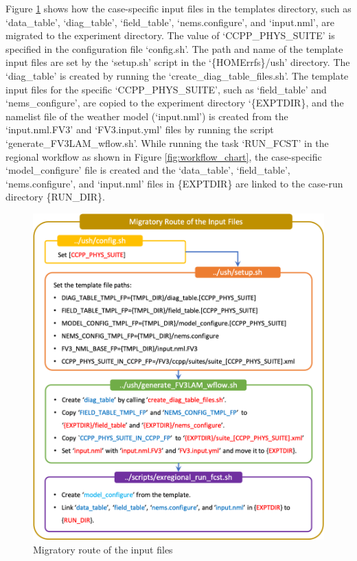 \documentclass[11pt,fleqn]{report}              %
\begin{document}
Figure \ref{fig:workflow_input_path} shows how the case-specific input files in the templates directory, such as `data\_table', `diag\_table', `field\_table', `nems.configure', and `input.nml', are migrated to the experiment directory. The value of `CCPP\_PHYS\_SUITE' is specified in the configuration file `config.sh'. The path and name of the template input files are set by the `setup.sh' script in the `\{HOMErrfs\}/ush' directory. The `diag\_table' is created by running the `create\_diag\_table\_files.sh'. The template input files for the specific `CCPP\_PHYS\_SUITE', such as `field\_table' and `nems\_configure', are copied to the experiment directory `\{EXPTDIR\}, and the namelist file of the weather model (`input.nml') is created from the `input.nml.FV3' and `FV3.input.yml' files by running the script `generate\_FV3LAM\_wflow.sh'. While running the task `RUN\_FCST' in the regional workflow as shown in Figure \ref{fig:workflow_chart}, the case-specific `model\_configure' file is created and the `data\_table', `field\_table', `nems.configure', and `input.nml' files in \{EXPTDIR\} are linked to the case-run directory \{RUN\_DIR\}. \\

\begin{figure}[ht!]
  \centering
  \includegraphics[width=0.8\linewidth]{Fv3LAM_wflow_input_path.png}
  \caption{Migratory route of the input files}
  \label{fig:workflow_input_path}
\end{figure}
\end{document}
